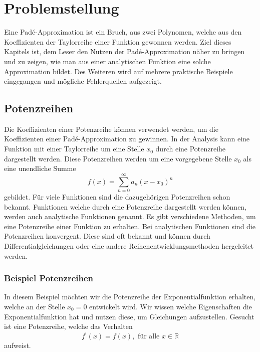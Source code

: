 %
%
%

\section{Problemstellung
\label{pade:section:Problemstellung}}
Eine Padé-Approximation ist ein Bruch, aus zwei Polynomen, welche aus den Koeffizienten der Taylorreihe einer Funktion gewonnen werden. 
Ziel dieses Kapitels ist, dem Leser den Nutzen der Padé-Approximation näher zu bringen und zu zeigen, wie man aus einer analytischen Funktion eine solche Approximation bildet.
Des Weiteren wird auf mehrere praktische Beispiele eingegangen und mögliche Fehlerquellen aufgezeigt. 



\subsection{Potenzreihen
\label{pade:subsection:Potenzreihen}}
Die Koeffizienten einer Potenzreihe können verwendet werden, um die Koeffizienten einer Padé-Approximation zu gewinnen. 
In der Analysis kann eine Funktion mit einer Taylorreihe um eine Stelle $x_{0}$ durch eine Potenzreihe dargestellt werden. 
Diese Potenzreihen werden um eine vorgegebene Stelle $x_{0}$ als eine unendliche Summe 
\begin{equation}
f(x)=\sum_{n=0}^{\infty} a_{n} (x-x_{0})^{n} 
\label{pade:expofunk}
\end{equation}
gebildet.
Für viele Funktionen sind die dazugehörigen Potenzreihen schon bekannt. 
Funktionen welche durch eine Potenzreihe dargestellt werden können, werden auch analytische Funktionen genannt.
Es gibt verschiedene Methoden, um eine Potenzreihe einer Funktion zu erhalten. 
Bei analytischen Funktionen sind die Potenzreihen konvergent.
Diese sind oft bekannt und können durch Differentialgleichungen oder eine andere Reihenentwicklungsmethoden hergeleitet werden.

\subsubsection{Beispiel Potenzreihen
\label{pade:section:Bsp_Potenzreihen}}
In diesem Beispiel möchten wir die Potenzreihe der Exponentialfunktion erhalten, welche an der Stelle $x_0 = 0$ entwickelt wird. 
Wir wissen welche Eigenschaften die Exponentialfunktion hat und nutzen diese, um Gleichungen aufzustellen. 
Gesucht ist eine Potenzreihe, welche das Verhalten 
\begin{equation*}
	f^{\prime}(x) = f(x) , \text{ für alle } x \in \mathbb{R} 
\end{equation*}
aufweist.

